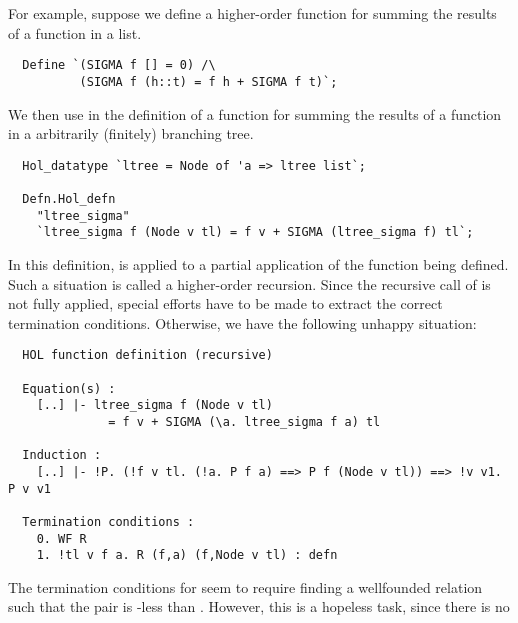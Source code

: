 For example, suppose we define a higher-order function  for
summing the results of a function in a list.
%
\setcounter{sessioncount}{0}
\begin{session}
\begin{hol}
\begin{verbatim}
  Define `(SIGMA f [] = 0) /\
          (SIGMA f (h::t) = f h + SIGMA f t)`;
\end{verbatim}
\end{hol}
\end{session}
%
We then use  in the definition of a function for
summing the results of a function in a arbitrarily
(finitely) branching tree.
%
\begin{session}
\begin{hol}
\begin{verbatim}
  Hol_datatype `ltree = Node of 'a => ltree list`;

  Defn.Hol_defn
    "ltree_sigma"
    `ltree_sigma f (Node v tl) = f v + SIGMA (ltree_sigma f) tl`;
\end{verbatim}
\end{hol}
\end{session}
%
In this definition, \holtxt{SIGMA} is applied to a partial application
\holtxt{(ltree\_sigma f)} of the function being defined. Such a situation
is called a higher-order recursion. Since the recursive call of
 is not fully applied, special efforts have
to be made to extract the correct termination conditions. Otherwise,
we have the following unhappy situation:
%
\begin{session}
\begin{hol}
\begin{verbatim}
  HOL function definition (recursive)

  Equation(s) :
    [..] |- ltree_sigma f (Node v tl)
              = f v + SIGMA (\a. ltree_sigma f a) tl

  Induction :
    [..] |- !P. (!f v tl. (!a. P f a) ==> P f (Node v tl)) ==> !v v1. P v v1

  Termination conditions :
    0. WF R
    1. !tl v f a. R (f,a) (f,Node v tl) : defn
\end{verbatim}
\end{hol}
\end{session}
%
The termination conditions for  seem to
require finding a wellfounded relation  such that the pair
\holtxt{(f,a)} is \holtxt{R}-less than
. However, this is a hopeless task, since there is no
